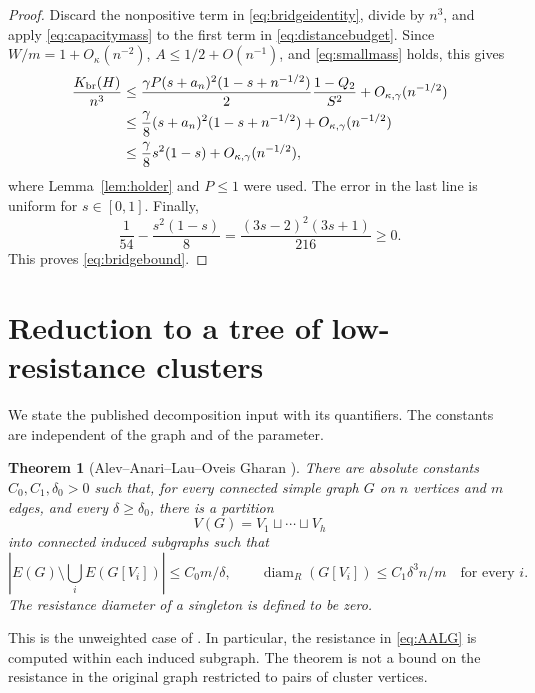 \documentclass[11pt]{amsart}
\numberwithin{equation}{section}
\newtheorem{theorem}{Theorem}[section]
\theoremstyle{definition}
\theoremstyle{remark}
\newcommand{\diamR}{\operatorname{diam}_{R}}
\newcommand{\Kbr}{K_{\mathrm{br}}}
\begin{document}
\begin{proof}
Discard the nonpositive term in \eqref{eq:bridgeidentity}, divide by $n^3$, and apply \eqref{eq:capacitymass} to the first term in \eqref{eq:distancebudget}. Since $W/m=1+O_\kappa(n^{-2})$, $A\le1/2+O(n^{-1})$, and \eqref{eq:smallmass} holds, this gives
\begin{align}
\frac{\Kbr(H)}{n^3}
&\le\frac{\gamma P(s+a_n)^2(1-s+n^{-1/2})}{2}
       \frac{1-Q_2}{S^2}
       +O_{\kappa,\gamma}(n^{-1/2})\notag\\
&\le\frac\gamma8(s+a_n)^2(1-s+n^{-1/2})
       +O_{\kappa,\gamma}(n^{-1/2})\notag\\
&\le\frac\gamma8s^2(1-s)+O_{\kappa,\gamma}(n^{-1/2}),\label{eq:bridgechain}
\end{align}
where Lemma~\ref{lem:holder} and $P\le1$ were used. The error in the last line is uniform for $s\in[0,1]$. Finally,
\begin{equation}\label{eq:cubicgap}
\frac1{54}-\frac{s^2(1-s)}8
=\frac{(3s-2)^2(3s+1)}{216}\ge0.
\end{equation}
This proves \eqref{eq:bridgebound}.
\end{proof}

\section{Reduction to a tree of low-resistance clusters}\label{sec:reduction}
We state the published decomposition input with its quantifiers. The constants are independent of the graph and of the parameter.

\begin{theorem}[Alev--Anari--Lau--Oveis Gharan \cite{AALG}]\label{thm:AALG}
There are absolute constants $C_0,C_1,\delta_0>0$ such that, for every connected simple graph $G$ on $n$ vertices and $m$ edges, and every $\delta\ge\delta_0$, there is a partition
\[
V(G)=V_1\sqcup\cdots\sqcup V_h
\]
into connected induced subgraphs such that
\begin{equation}\label{eq:AALG}
\left|E(G)\setminus\bigcup_iE(G[V_i])\right|
\le C_0m/\delta,\qquad
\diamR(G[V_i])\le C_1\delta^3n/m\quad\text{for every }i.
\end{equation}
The resistance diameter of a singleton is defined to be zero.
\end{theorem}

This is the unweighted case of \cite[Theorem~3]{AALG}. In particular, the resistance in \eqref{eq:AALG} is computed within each induced subgraph. The theorem is not a bound on the resistance in the original graph restricted to pairs of cluster vertices.
\end{document}
